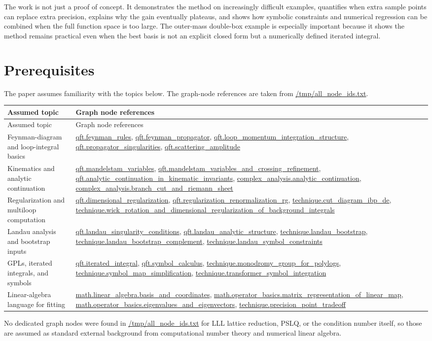 \documentclass[11pt]{article}
\begin{document}
The work is not just a proof of concept. It demonstrates the method on increasingly difficult examples, quantifies when extra sample points can replace extra precision, explains why the gain eventually plateaus, and shows how symbolic constraints and numerical regression can be combined when the full function space is too large. The outer-mass double-box example is especially important because it shows the method remains practical even when the best basis is not an explicit closed form but a numerically defined iterated integral.

\appendix
\section{Prerequisites}
The paper assumes familiarity with the topics below. The graph-node references are taken from \url{/tmp/all_node_ids.txt}.

\begin{longtable}{>{\raggedright\arraybackslash}p{4.2cm} p{10.3cm}}
\toprule
Assumed topic & Graph node references \\
\midrule
\endfirsthead
\toprule
Assumed topic & Graph node references \\
\midrule
\endhead
Feynman-diagram and loop-integral basics &
\url{qft.feynman_rules}, \url{qft.feynman_propagator}, \url{qft.loop_momentum_integration_structure}, \url{qft.propagator_singularities}, \url{qft.scattering_amplitude} \\
Kinematics and analytic continuation &
\url{qft.mandelstam_variables}, \url{qft.mandelstam_variables_and_crossing_refinement}, \url{qft.analytic_continuation_in_kinematic_invariants}, \url{complex_analysis.analytic_continuation}, \url{complex_analysis.branch_cut_and_riemann_sheet} \\
Regularization and multiloop computation &
\url{qft.dimensional_regularization}, \url{qft.regularization_renormalization_rg}, \url{technique.cut_diagram_ibp_de}, \url{technique.wick_rotation_and_dimensional_regularization_of_background_integrals} \\
Landau analysis and bootstrap inputs &
\url{qft.landau_singularity_conditions}, \url{qft.landau_analytic_structure}, \url{technique.landau_bootstrap}, \url{technique.landau_bootstrap_complement}, \url{technique.landau_symbol_constraints} \\
GPLs, iterated integrals, and symbols &
\url{qft.iterated_integral}, \url{qft.symbol_calculus}, \url{technique.monodromy_group_for_polylogs}, \url{technique.symbol_map_simplification}, \url{technique.transformer_symbol_integration} \\
Linear-algebra language for fitting &
\url{math.linear_algebra.basis_and_coordinates}, \url{math.operator_basics.matrix_representation_of_linear_map}, \url{math.operator_basics.eigenvalues_and_eigenvectors}, \url{technique.precision_point_tradeoff} \\
\bottomrule
\end{longtable}

No dedicated graph nodes were found in \url{/tmp/all_node_ids.txt} for LLL lattice reduction, PSLQ, or the condition number itself, so those are assumed as standard external background from computational number theory and numerical linear algebra.
\end{document}

